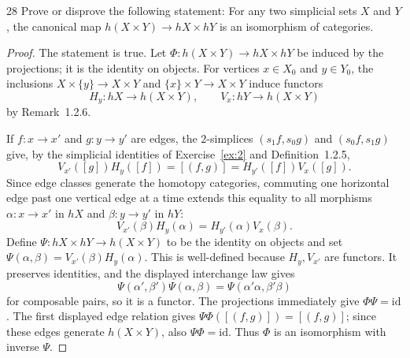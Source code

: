 \begin{exercise}{28}
Prove or disprove the following statement: For any two simplicial sets $X$ and
$Y$, the canonical map $h(X\times Y)\to hX\times hY$ is an isomorphism of categories.

\begin{proof}
The statement is true. Let $\Phi\colon h(X\times Y)\to hX\times hY$
be induced by the projections; it is the identity on objects.
For vertices $x\in X_0$ and $y\in Y_0$, the inclusions
$X\times\{y\}\to X\times Y$ and $\{x\}\times Y\to X\times Y$
induce functors
\[
 H_y\colon hX\longrightarrow h(X\times Y),
 \qquad V_x\colon hY\longrightarrow h(X\times Y)
\]
by Remark~1.2.6.

If $f\colon x\to x'$ and $g\colon y\to y'$ are edges,
the $2$-simplices $(s_1f,s_0g)$ and $(s_0f,s_1g)$ give,
by the simplicial identities of Exercise~\ref{ex:2} and
Definition~1.2.5,
\[
 V_{x'}([g])H_y([f])=[(f,g)]=H_{y'}([f])V_x([g]).
\]
Since edge classes generate the homotopy categories, commuting
one horizontal edge past one vertical edge at a time extends
this equality to all morphisms $\alpha\colon x\to x'$ in $hX$
and $\beta\colon y\to y'$ in $hY$:
\[
 V_{x'}(\beta)H_y(\alpha)=H_{y'}(\alpha)V_x(\beta).
\]
Define $\Psi\colon hX\times hY\to h(X\times Y)$ to be the
identity on objects and set
$\Psi(\alpha,\beta)=V_{x'}(\beta)H_y(\alpha)$.
This is well-defined because $H_y,V_{x'}$ are functors.
It preserves identities, and the displayed interchange law
gives
\[
 \Psi(\alpha',\beta')\Psi(\alpha,\beta)
 =\Psi(\alpha'\alpha,\beta'\beta)
\]
for composable pairs, so it is a functor.
The projections immediately give $\Phi\Psi=\mathrm{id}$.
The first displayed edge relation gives
$\Psi\Phi([(f,g)])=[(f,g)]$; since these edges generate
$h(X\times Y)$, also $\Psi\Phi=\mathrm{id}$.
Thus $\Phi$ is an isomorphism with inverse $\Psi$.
\end{proof}
\end{exercise}
